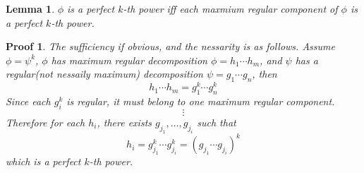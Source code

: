 \documentclass{article}
\newtheorem{lem}{Lemma}
\newtheorem{prof}{Proof}
\begin{document}
\begin{lem}
$\phi$ is a perfect $k$-th power iff each maxmium
regular component of $\phi$ is a perfect $k$-th power.
\end{lem}

\begin{prof}
The sufficiency if obvious, and the nessarity is as follows.
Assume $\phi = \psi^k$,
$\phi$ has maximum regular decomposition $\phi = h_1 \cdots h_m$,
and $\psi$ has a regular(not nessaily maximum) decomposition $\psi = g_1 \cdots g_n$, 
then $$h_1 \cdots h_m = g_1^k \cdots g_n^k$$
Since each $g_i^k$ is regular, it must belong to one maximum regular component.
$$\vdots$$
Therefore for each $h_i$, there exists $g_{j_1}, \dots, g_{j_i}$ such that
$$h_i = g_{j_1}^k \cdots g_{j_i}^k = (g_{j_1} \cdots g_{j_i})^k$$
which is a perfect $k$-th power.

\end{prof}
\end{document}
